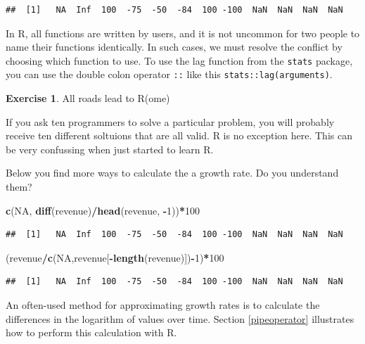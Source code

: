 \documentclass[
  12pt,
  oneside]{book}
\newenvironment{Shaded}{\begin{snugshade}}{\end{snugshade}}
\newcommand{\ConstantTok}[1]{\textcolor[rgb]{0.56,0.35,0.01}{#1}}
\newcommand{\DecValTok}[1]{\textcolor[rgb]{0.00,0.00,0.81}{#1}}
\newcommand{\FunctionTok}[1]{\textcolor[rgb]{0.13,0.29,0.53}{\textbf{#1}}}
\newcommand{\NormalTok}[1]{#1}
\newcommand{\SpecialCharTok}[1]{\textcolor[rgb]{0.81,0.36,0.00}{\textbf{#1}}}
\theoremstyle{definition}
\theoremstyle{definition}
\theoremstyle{definition}
\newtheorem{exercise}{Exercise}[chapter]
\theoremstyle{definition}
\theoremstyle{remark}
\begin{document}
\begin{verbatim}
##  [1]   NA  Inf  100  -75  -50  -84  100 -100  NaN  NaN  NaN  NaN
\end{verbatim}

In R, all functions are written by users, and it is not uncommon for two people to name their functions identically. In such cases, we must resolve the conflict by choosing which function to use. To use the lag function from the \texttt{stats} package, you can use the double colon operator \texttt{::} like this \texttt{stats::lag(arguments)}.

\begin{exercise}
\protect\hypertarget{exr:growthrate}{}\label{exr:growthrate}All roads lead to R(ome)

If you ask ten programmers to solve a particular problem, you will probably receive ten different soltuions that are all valid. R is no exception here. This can be very confussing when just started to learn R.

Below you find more ways to calculate the a growth rate. Do you understand them?

\begin{Shaded}
\begin{Highlighting}[]
\FunctionTok{c}\NormalTok{(}\ConstantTok{NA}\NormalTok{, }\FunctionTok{diff}\NormalTok{(revenue)}\SpecialCharTok{/}\FunctionTok{head}\NormalTok{(revenue, }\SpecialCharTok{{-}}\DecValTok{1}\NormalTok{))}\SpecialCharTok{*}\DecValTok{100}        
\end{Highlighting}
\end{Shaded}

\begin{verbatim}
##  [1]   NA  Inf  100  -75  -50  -84  100 -100  NaN  NaN  NaN  NaN
\end{verbatim}

\begin{Shaded}
\begin{Highlighting}[]
\NormalTok{(revenue}\SpecialCharTok{/}\FunctionTok{c}\NormalTok{(}\ConstantTok{NA}\NormalTok{,revenue[}\SpecialCharTok{{-}}\FunctionTok{length}\NormalTok{(revenue)])}\SpecialCharTok{{-}}\DecValTok{1}\NormalTok{)}\SpecialCharTok{*}\DecValTok{100}
\end{Highlighting}
\end{Shaded}

\begin{verbatim}
##  [1]   NA  Inf  100  -75  -50  -84  100 -100  NaN  NaN  NaN  NaN
\end{verbatim}

An often-used method for approximating growth rates is to calculate the differences in the logarithm of values over time. Section \ref{pipeoperator} illustrates how to perform this calculation with R.
\end{exercise}
\end{document}
